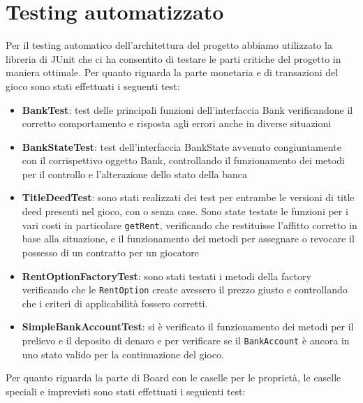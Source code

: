 \section{Testing automatizzato}
Per il testing automatico dell'architettura del progetto abbiamo utilizzato la libreria di JUnit che ci ha consentito di testare le parti critiche del progetto in maniera ottimale.
Per quanto riguarda la parte monetaria e di transazioni del gioco sono stati effettuati i seguenti test:\newline
\begin{itemize}
    \item \textbf{BankTest}: test delle principali funzioni dell'interfaccia Bank verificandone il corretto comportamento e risposta agli errori anche in diverse situazioni
    \item \textbf{BankStateTest}: test dell'interfaccia BankState avvenuto congiuntamente con il corrispettivo oggetto Bank, controllando il funzionamento dei metodi per il controllo e l'alterazione dello stato della banca 
    \item \textbf{TitleDeedTest}: sono stati realizzati dei test per entrambe le versioni di title deed presenti nel gioco, con o senza case. Sono state testate le funzioni per i vari costi in particolare \texttt{getRent}, verificando che restituisse l'affitto corretto in base alla situazione, e il funzionamento dei metodi per assegnare o revocare il possesso di un contratto per un giocatore
    \item \textbf{RentOptionFactoryTest}: sono stati testati i metodi della factory verificando che le \texttt{RentOption} create avessero il prezzo giusto e controllando che i criteri di applicabilità fossero corretti.
    \item \textbf{SimpleBankAccountTest}: si è verificato il funzionamento dei metodi per il prelievo e il deposito di denaro e per verificare se il \texttt{BankAccount} è ancora in uno stato valido per la continuazione del gioco.  
\end{itemize}
Per quanto riguarda la parte di Board con le caselle per le proprietà, le caselle speciali e imprevisti sono stati effettuati i seguienti test:\newline
